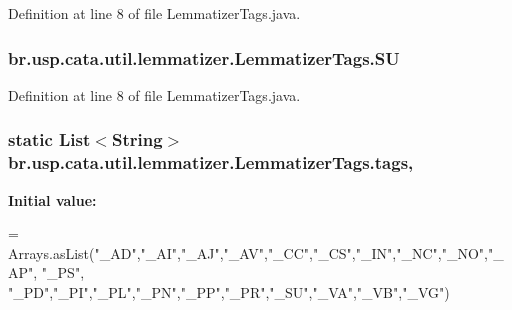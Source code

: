 Definition at line 8 of file Lemmatizer\+Tags.\+java.

\hypertarget{enumbr_1_1usp_1_1cata_1_1util_1_1lemmatizer_1_1_lemmatizer_tags_a8e480afa19f646695cc5f3c9ae68f131}{
\subsubsection[{S\+U}]{\setlength{\rightskip}{0pt plus 5cm}br.\+usp.\+cata.\+util.\+lemmatizer.\+Lemmatizer\+Tags.\+S\+U}}\label{enumbr_1_1usp_1_1cata_1_1util_1_1lemmatizer_1_1_lemmatizer_tags_a8e480afa19f646695cc5f3c9ae68f131}


Definition at line 8 of file Lemmatizer\+Tags.\+java.

\hypertarget{enumbr_1_1usp_1_1cata_1_1util_1_1lemmatizer_1_1_lemmatizer_tags_a7dec6bbb23020ed8e642eaa31f4982aa}{
\subsubsection[{tags}]{\setlength{\rightskip}{0pt plus 5cm} static  List$<$String$>$ br.\+usp.\+cata.\+util.\+lemmatizer.\+Lemmatizer\+Tags.\+tags\hspace{0.3cm}{\ttfamily [static]}, {\ttfamily [private]}}}\label{enumbr_1_1usp_1_1cata_1_1util_1_1lemmatizer_1_1_lemmatizer_tags_a7dec6bbb23020ed8e642eaa31f4982aa}
{\bfseries Initial value\+:}
\begin{DoxyCode}
=
        Arrays.asList(\textcolor{stringliteral}{"\_AD"},\textcolor{stringliteral}{"\_AI"},\textcolor{stringliteral}{"\_AJ"},\textcolor{stringliteral}{"\_AV"},\textcolor{stringliteral}{"\_CC"},\textcolor{stringliteral}{"\_CS"},\textcolor{stringliteral}{"\_IN"},\textcolor{stringliteral}{"\_NC"},\textcolor{stringliteral}{"\_NO"},\textcolor{stringliteral}{"\_AP"},
                \textcolor{stringliteral}{"\_PS"}, \textcolor{stringliteral}{"\_PD"},\textcolor{stringliteral}{"\_PI"},\textcolor{stringliteral}{"\_PL"},\textcolor{stringliteral}{"\_PN"},\textcolor{stringliteral}{"\_PP"},\textcolor{stringliteral}{"\_PR"},\textcolor{stringliteral}{"\_SU"},\textcolor{stringliteral}{"\_VA"},\textcolor{stringliteral}{"\_VB"},\textcolor{stringliteral}{"\_VG"})
\end{DoxyCode}


